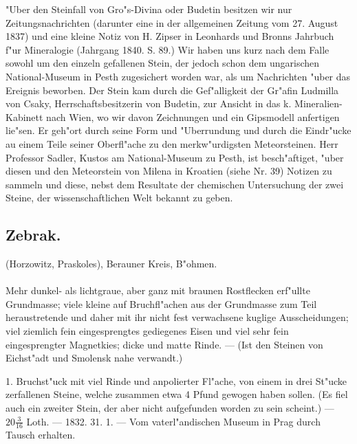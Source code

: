 \documentclass[a4paper, 11pt, oneside, polutonikogreek, german]{article}
\begin{document}
\setlength{\leftskip}{10mm}
\setlength{\parindent}{0pt}

{\footnotesize "Uber den Steinfall von Gro"s-Divina oder Budetin besitzen wir nur Zeitungsnachrichten (darunter eine in der allgemeinen Zeitung vom 27. August 1837) und eine kleine Notiz von H. Zipser in Leonhards und Bronns Jahrbuch f"ur Mineralogie (Jahrgang 1840. S. 89.) Wir haben uns kurz nach dem Falle sowohl um den einzeln gefallenen Stein, der jedoch schon dem ungarischen National-Museum in Pesth zugesichert worden war, als um Nachrichten "uber das Ereignis beworben. Der Stein kam durch die Gef"alligkeit der Gr"afin Ludmilla von Csaky, Herrschaftsbesitzerin von Budetin, zur Ansicht in das k. Mineralien-Kabinett nach Wien, wo wir davon Zeichnungen und ein Gipsmodell anfertigen lie"sen. Er geh"ort durch seine Form und "Uberrundung und durch die Eindr"ucke au einem Teile seiner Oberfl"ache zu den merkw"urdigsten Meteorsteinen. Herr Professor Sadler, Kustos am National-Museum zu Pesth, ist besch"aftiget, "uber diesen und den Meteorstein von Milena in Kroatien (siehe Nr. 39) Notizen zu sammeln und diese, nebst dem Resultate der chemischen Untersuchung der zwei Steine, der wissenschaftlichen Welt bekannt zu geben.}

\setlength{\leftskip}{0pt}
\setlength{\parindent}{20pt}

\subsection{Zebrak.}
\begin{center}
\small
(Horzowitz, Praskoles), Berauner Kreis, B"ohmen.
\end{center}
\paragraph{}
Mehr dunkel- als lichtgraue, aber ganz mit braunen Rostflecken erf"ullte Grundmasse; viele kleine auf Bruchfl"achen aus der Grundmasse zum Teil heraustretende und daher mit ihr nicht fest verwachsene kuglige Ausscheidungen; viel ziemlich fein eingesprengtes gediegenes Eisen und viel sehr fein eingesprengter Magnetkies; dicke und matte Rinde. --- (Ist den Steinen von Eichst"adt und Smolensk nahe verwandt.)

1. Bruchst"uck mit viel Rinde und anpolierter Fl"ache, von einem in drei St"ucke zerfallenen Steine, welche zusammen etwa 4 Pfund gewogen haben sollen. (Es fiel auch ein zweiter Stein, der aber nicht aufgefunden worden zu sein scheint.) --- $20\frac{3}{16}$ Loth. --- 1832. 31. 1. --- Vom vaterl"andischen Museum in Prag durch Tausch erhalten.
\end{document}
